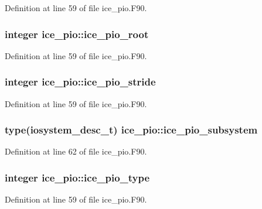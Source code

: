 Definition at line 59 of file ice\_\-pio.F90.\hypertarget{namespaceice__pio_a005816f4168d35918e2c74a88989e871}{
\subsubsection[{ice\_\-pio\_\-root}]{\setlength{\rightskip}{0pt plus 5cm}integer {\bf ice\_\-pio::ice\_\-pio\_\-root}}}
\label{namespaceice__pio_a005816f4168d35918e2c74a88989e871}


Definition at line 59 of file ice\_\-pio.F90.\hypertarget{namespaceice__pio_a5de9334d10947cea25743c63ea790857}{
\subsubsection[{ice\_\-pio\_\-stride}]{\setlength{\rightskip}{0pt plus 5cm}integer {\bf ice\_\-pio::ice\_\-pio\_\-stride}}}
\label{namespaceice__pio_a5de9334d10947cea25743c63ea790857}


Definition at line 59 of file ice\_\-pio.F90.\hypertarget{namespaceice__pio_ad7b25bee3af2d23622eded54fa930040}{
\subsubsection[{ice\_\-pio\_\-subsystem}]{\setlength{\rightskip}{0pt plus 5cm}type(iosystem\_\-desc\_\-t) {\bf ice\_\-pio::ice\_\-pio\_\-subsystem}}}
\label{namespaceice__pio_ad7b25bee3af2d23622eded54fa930040}


Definition at line 62 of file ice\_\-pio.F90.\hypertarget{namespaceice__pio_a29c1f71d91a554fa266112edb114b555}{
\subsubsection[{ice\_\-pio\_\-type}]{\setlength{\rightskip}{0pt plus 5cm}integer {\bf ice\_\-pio::ice\_\-pio\_\-type}}}
\label{namespaceice__pio_a29c1f71d91a554fa266112edb114b555}


Definition at line 59 of file ice\_\-pio.F90.